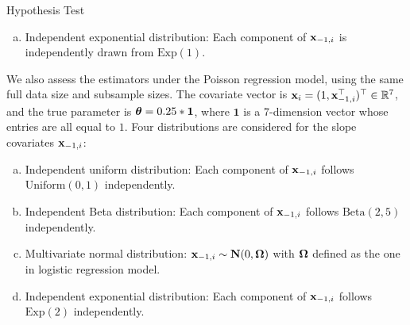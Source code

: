 \documentclass[12pt,hidelinks]{article}
\begin{document}
\begin{section}{Hypothesis Test}
\begin{enumerate}[(a)]
    \item Independent exponential distribution: Each component of $\mathbf{x}_{-1,i}$ is independently drawn from $\text{Exp}(1)$. 
\end{enumerate}

We also assess the estimators under the Poisson regression model, using the same full data size and subsample sizes. The covariate vector is $\mathbf{x}_i = (1, \mathbf{x}_{-1,i}^\top)^\top \in \mathbb{R}^7$, and the true parameter is $\bm{\theta} = 0.25 * \mathbf{1}$, where $\mathbf{1}$ is a 7-dimension vector whose entries are all equal to $1$.
Four distributions are considered for the slope covariates $\mathbf{x}_{-1,i}$:
\begin{enumerate}[(a)]
    \item Independent uniform distribution: Each component of $\mathbf{x}_{-1,i}$ follows $\text{Uniform}(0,1)$ independently. 

    \item Independent Beta distribution: Each component of $\mathbf{x}_{-1,i}$ follows $\text{Beta}(2, 5)$ independently. 

    \item Multivariate normal distribution: $\mathbf{x}_{-1,i} \sim \mathbf{N}(0, \bm{\Omega})$ with $\bm{\Omega}$ defined as the one in logistic regression model.

    \item Independent exponential distribution: Each component of $\mathbf{x}_{-1,i}$ follows $\text{Exp}(2)$ independently.
\end{enumerate}


\end{section}
\end{document}
